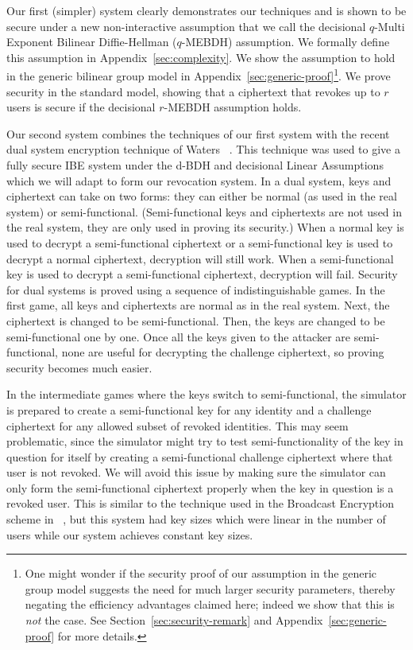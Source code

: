 \documentclass[a4paper, 11pt]{article}
\theoremstyle{definition}
\begin{document}
Our first (simpler) system clearly demonstrates our techniques and is shown to be secure under a new non-interactive
assumption that we call the decisional $q$-Multi Exponent Bilinear
Diffie-Hellman ($q$-MEBDH) assumption. We formally define this assumption in Appendix~\ref{sec:complexity}. We show the assumption to hold
in the generic bilinear group model in
Appendix~\ref{sec:generic-proof}\footnote{One might wonder if the
security proof of our assumption in the generic group model suggests
the need for much larger security parameters, thereby negating the
efficiency advantages claimed here; indeed we show that this is
\emph{not} the case.  See Section~\ref{sec:security-remark} and
Appendix~\ref{sec:generic-proof} for more details.}. We prove security
in the standard model, showing that a ciphertext that revokes up to
$r$ users is secure if the decisional $r$-MEBDH assumption holds.

Our second system combines the techniques of our first system with the recent dual system encryption technique of Waters ~\cite{W09}. This technique was used to give a fully secure IBE system under the d-BDH and decisional Linear Assumptions which we will adapt to form our revocation system. In a dual system, keys and ciphertext can take on two forms: they can either be normal (as used in the real system) or semi-functional. (Semi-functional keys and ciphertexts are not used in the real system, they are only used in proving its security.) When a normal key is used to decrypt a semi-functional ciphertext or a semi-functional key is used to decrypt a normal ciphertext, decryption will still work. When a semi-functional key is used to decrypt a semi-functional ciphertext, decryption will fail. Security for dual systems is proved using a sequence of indistinguishable games. In the first game, all keys and ciphertexts are normal as in the real system. Next, the ciphertext is  changed to be semi-functional. Then, the keys are changed to be semi-functional one by one. Once all the keys given to the attacker are semi-functional, none are useful for decrypting the challenge ciphertext, so proving security becomes much easier.

In the intermediate games where the keys switch to semi-functional, the simulator is prepared to create a semi-functional key for any identity and a challenge ciphertext for any allowed subset of revoked identities. This may seem problematic, since the simulator might try to test semi-functionality of the key in question for itself by creating a semi-functional challenge ciphertext where that user is not revoked. We will avoid this issue by making sure the simulator can only form the semi-functional ciphertext properly when the key in question is a revoked user. This is similar to the technique used in the Broadcast Encryption scheme in ~\cite{W09}, but this system had key sizes which were linear in the number of users while our system achieves constant key sizes.
\end{document}

